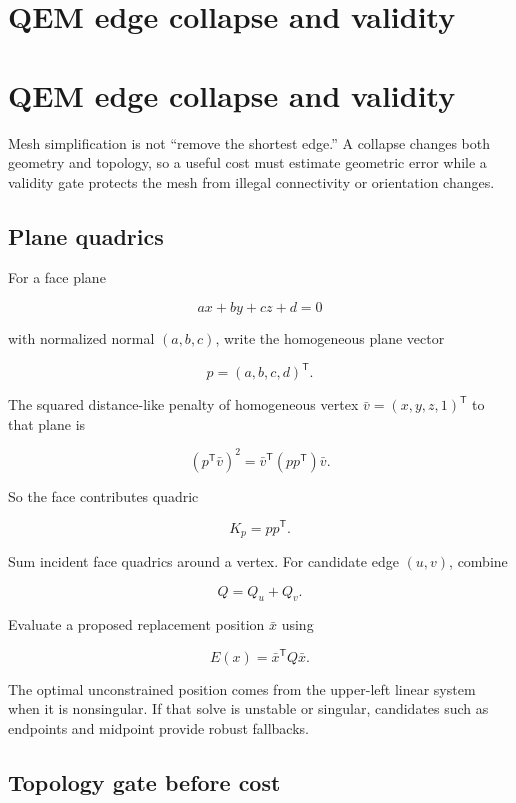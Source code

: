 \hypertarget{appendix-89db9fe1bc8a}{}
\section*{QEM edge collapse and validity}
\section{QEM edge collapse and validity}\label{appendix-89db9fe1bc8a-qem-edge-collapse-and-validity}

Mesh simplification is not ``remove the shortest edge.'' A collapse changes both geometry and topology, so a useful cost must estimate geometric error while a validity gate protects the mesh from illegal connectivity or orientation changes.

\subsection{Plane quadrics}\label{appendix-89db9fe1bc8a-plane-quadrics}

For a face plane

\[
ax+by+cz+d=0
\]

with normalized normal \((a,b,c)\), write the homogeneous plane vector

\[
p=(a,b,c,d)^{\mathsf T}.
\]

The squared distance-like penalty of homogeneous vertex \(\bar v=(x,y,z,1)^{\mathsf T}\) to that plane is

\[
(p^{\mathsf T}\bar v)^2
=
\bar v^{\mathsf T}(pp^{\mathsf T})\bar v.
\]

So the face contributes quadric

\[
K_p=pp^{\mathsf T}.
\]

Sum incident face quadrics around a vertex. For candidate edge \((u,v)\), combine

\[
Q=Q_u+Q_v.
\]

Evaluate a proposed replacement position \(\bar x\) using

\[
E(x)=\bar x^{\mathsf T}Q\bar x.
\]

The optimal unconstrained position comes from the upper-left linear system when it is nonsingular. If that solve is unstable or singular, candidates such as endpoints and midpoint provide robust fallbacks.

\subsection{Topology gate before cost}\label{appendix-89db9fe1bc8a-topology-gate-before-cost}

